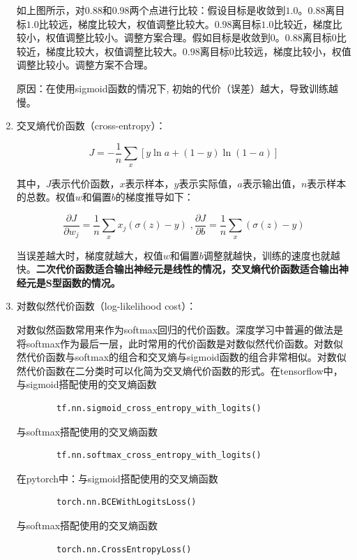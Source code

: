 \begin{enumerate}
如上图所示，对$0.88$和$0.98$两个点进行比较：假设目标是收敛到$1.0$。$0.88$离目标$1.0$比较远，梯度比较大，权值调整比较大。$0.98$离目标$1.0$比较近，梯度比较小，权值调整比较小。调整方案合理。假如目标是收敛到$0$。$0.88$离目标$0$比较近，梯度比较大，权值调整比较大。$0.98$离目标$0$比较远，梯度比较小，权值调整比较小。调整方案不合理。

原因：在使用sigmoid函数的情况下, 初始的代价（误差）越大，导致训练越慢。

\item 交叉熵代价函数（cross-entropy）：

$$
J = -\frac{1}{n}\sum_x[y\ln a + (1-y)\ln{(1-a)}]
$$

其中，$J$表示代价函数，$x$表示样本，$y$表示实际值，$a$表示输出值，$n$表示样本的总数。权值$w$和偏置$b$的梯度推导如下：

$$
\frac{\partial J}{\partial w_j}=\frac{1}{n}\sum_{x}x_j(\sigma{(z)}-y)\;,
\frac{\partial J}{\partial b}=\frac{1}{n}\sum_{x}(\sigma{(z)}-y)
$$

		当误差越大时，梯度就越大，权值$w$和偏置$b$调整就越快，训练的速度也就越快。{\bf 二次代价函数适合输出神经元是线性的情况，交叉熵代价函数适合输出神经元是S型函数的情况。}

	\item 对数似然代价函数（log-likelihood cost）：

对数似然函数常用来作为softmax回归的代价函数。深度学习中普遍的做法是将softmax作为最后一层，此时常用的代价函数是对数似然代价函数。对数似然代价函数与softmax的组合和交叉熵与sigmoid函数的组合非常相似。对数似然代价函数在二分类时可以化简为交叉熵代价函数的形式。在tensorflow中，与sigmoid搭配使用的交叉熵函数

		\begin{lstlisting}
		tf.nn.sigmoid_cross_entropy_with_logits()
		\end{lstlisting}

		与softmax搭配使用的交叉熵函数

		\begin{lstlisting}
		tf.nn.softmax_cross_entropy_with_logits()
		\end{lstlisting}

在pytorch中：与sigmoid搭配使用的交叉熵函数

		\begin{lstlisting}
		torch.nn.BCEWithLogitsLoss()
		\end{lstlisting}

与softmax搭配使用的交叉熵函数

		\begin{lstlisting}
		torch.nn.CrossEntropyLoss()
		\end{lstlisting}

\end{enumerate}

